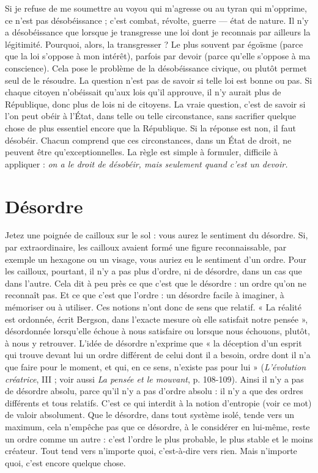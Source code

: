 Si je refuse de me soumettre au voyou qui m’agresse ou au tyran qui
m'opprime, ce n’est pas désobéissance ; c’est combat, révolte, guerre — état de
nature. Il n’y a désobéissance que lorsque je transgresse une loi dont je reconnais
par ailleurs la légitimité. Pourquoi, alors, la transgresser ? Le plus souvent
par égoïsme (parce que la loi s’oppose à mon intérêt), parfois par devoir (parce
qu'elle s'oppose à ma conscience). Cela pose le problème de la désobéissance
civique, ou plutôt permet seul de le résoudre. La question n’est pas de savoir si
telle loi est bonne ou pas. Si chaque citoyen n’obéissait qu'aux lois qu'il
approuve, il n’y aurait plus de République, donc plus de lois ni de citoyens. La
vraie question, c’est de savoir si l’on peut obéir à l'État, dans telle ou telle circonstance,
sans sacrifier quelque chose de plus essentiel encore que la République.
Si la réponse est non, il faut désobéir. Chacun comprend que ces circonstances,
dans un État de droit, ne peuvent être qu’exceptionnelles. La règle
est simple à formuler, difficile à appliquer : {\it on a le droit de désobéir, mais
seulement quand c'est un devoir.}

\section{Désordre}
Jetez une poignée de cailloux sur le sol : vous aurez le sentiment
du désordre. Si, par extraordinaire, les cailloux avaient
formé une figure reconnaissable, par exemple un hexagone ou un visage, vous
auriez eu le sentiment d’un ordre. Pour les cailloux, pourtant, il n’y a pas plus
d'ordre, ni de désordre, dans un cas que dans l’autre. Cela dit à peu près ce que
c'est que le désordre : un ordre qu’on ne reconnaît pas. Et ce que c’est que
l’ordre : un désordre facile à imaginer, à mémoriser ou à utiliser. Ces notions
n'ont donc de sens que relatif. « La réalité est ordonnée, écrit Bergson, dans
l’exacte mesure où elle satisfait notre pensée », désordonnée lorsqu’elle échoue
à nous satisfaire ou lorsque nous échouons, plutôt, à nous y retrouver. L'idée
de désordre n’exprime que « la déception d’un esprit qui trouve devant lui un
ordre différent de celui dont il a besoin, ordre dont il n’a que faire pour le
moment, et qui, en ce sens, n'existe pas pour lui » ({\it L'évolution créatrice}, III ;
voir aussi {\it La pensée et le mouvant}, p. 108-109). Ainsi il n’y a pas de désordre
absolu, parce qu’il n’y a pas d’ordre absolu : il n’y a que des ordres différents et
tous relatifs. C’est ce qui interdit à la notion d’entropie (voir ce mot) de valoir
absolument. Que le désordre, dans tout système isolé, tende vers un maximum,
cela n'empêche pas que ce désordre, à le considérer en lui-même, reste un ordre
comme un autre : c’est l’ordre le plus probable, le plus stable et le moins créateur.
Tout tend vers n’importe quoi, c’est-à-dire vers rien. Mais n'importe
quoi, c’est encore quelque chose.

